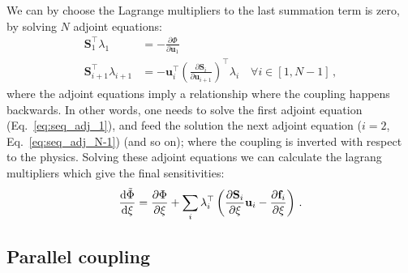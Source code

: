 We can by choose the Lagrange multipliers to the last summation term is zero, by solving $N$ adjoint equations:
\begin{align}
    \mathbf{S}^\top_{1}\lambda_{1} &= - \frac{\partial \Phi}{\partial \mathbf{u}_{1}} \label{eq:seq_adj_1}\,\\
    \mathbf{S}^\top_{i+1}\lambda_{i+1} &= - \mathbf{u}^\top_i \left(\frac{\partial \mathbf{S}_i}{\partial \mathbf{u}_{i+1}}\right)^\top \lambda_i \quad \forall i \in [1, N-1] \label{eq:seq_adj_N-1}\,,
\end{align}
where the adjoint equations imply a relationship where the coupling happens backwards. In other words, one needs to solve the first adjoint equation (Eq.~\eqref{eq:seq_adj_1}), 
and feed the solution the next adjoint equation ($i=2$, Eq.~\eqref{eq:seq_adj_N-1}) (and so on); where the coupling is inverted with respect to the physics. Solving these adjoint equations we can calculate the lagrang
multipliers which give the final sensitivities:
\begin{equation}
    \frac{\mathop{}\!\text{d} \tilde{\Phi}}{\mathop{}\!\text{d} \xi} = \frac{\partial \Phi}{\partial \xi} + \sum_i \lambda_{i}^{\top} \left( \frac{\partial \mathbf{S}_i}{\partial \xi} \mathbf{u}_i - \frac{\partial \mathbf{f}_i}{\partial \xi} \right)\,.
\end{equation}

\subsection{Parallel coupling}

